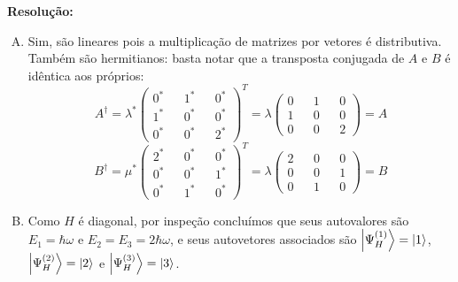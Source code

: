 \documentclass[a4paper, 12pt, notitlepage]{article}
\begin{document}
\begin{enumerate}
\textbf{Resolução: }
\begin{enumerate}[(A)]
  \item Sim, são lineares pois a multiplicação de matrizes por vetores é distributiva. Também são hermitianos: basta notar que a transposta conjugada de $A$ e $B$ é idêntica aos próprios:
  \[ A^\dagger = \lambda^\ast 
  \begin{pmatrix} 
  0^\ast && 1^\ast && 0^\ast \\
  1^\ast && 0^\ast && 0^\ast \\
  0^\ast && 0^\ast && 2^\ast
  \end{pmatrix}^T = \lambda \begin{pmatrix}
  0 && 1 && 0 \\
  1 && 0 && 0 \\
  0 && 0 && 2
  \end{pmatrix} = A
  \]
  \[ B^\dagger = \mu^\ast 
  \begin{pmatrix} 
  2^\ast && 0^\ast && 0^\ast \\
  0^\ast && 0^\ast && 1^\ast \\
  0^\ast && 1^\ast && 0^\ast
  \end{pmatrix}^T = \lambda \begin{pmatrix}
  2 && 0 && 0 \\
  0 && 0 && 1 \\
  0 && 1 && 0
  \end{pmatrix} = B
  \]
  \item Como $H$ é diagonal, por inspeção concluímos que seus autovalores são $E_1 = \hbar \omega$ e $E_2 = E_3 = 2\hbar \omega$, e seus autovetores associados são $\ket{\Psi_H^{(1)}} = \ket{1}$, $\ket{\Psi_H^{(2)}} = \ket{2}$ e $\ket{\Psi_H^{(3)}} = \ket{3}$.


\end{enumerate}
\end{enumerate}
\end{document}

